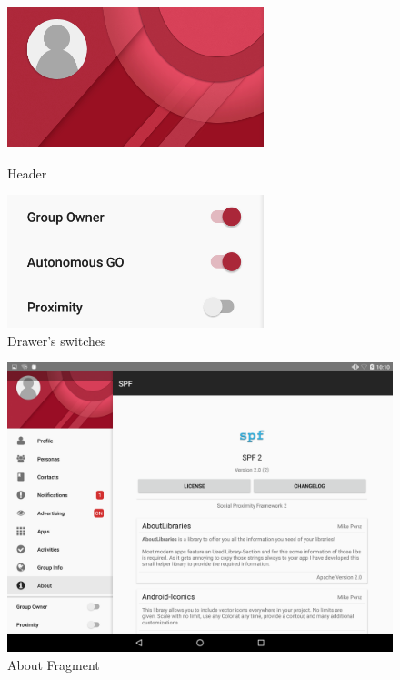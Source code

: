 \begin{figure}[thpb]
\centering
\begin{minipage}[b]{0.4\textwidth}
	\centering
	\includegraphics[width=\textwidth]{./images/chap3/header.png}
	\caption{Header}
	\label{fig:header}
\end{minipage}
\hfill
\begin{minipage}[b]{0.4\textwidth}
	\centering
	\includegraphics[width=\textwidth]{./images/chap3/switches.png}
	\caption{Drawer's switches}
	\label{fig:switches}
\end{minipage}	
\end{figure}


\begin{figure}[thpb]
	\centering
	\includegraphics[scale=0.15]{./images/chap3/about_fragment.png}
	\caption{About Fragment}
	\label{fig:about}
\end{figure}	


